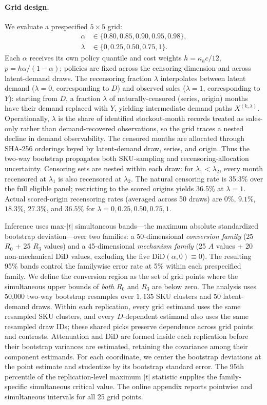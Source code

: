 \documentclass[msom,dblanonrev]{informs4}
\begin{document}
\paragraph{Grid design.}
We evaluate a prespecified $5\times 5$ grid:
\[
\begin{aligned}
\alpha &\in \{0.80,0.85,0.90,0.95,0.98\},\\
\lambda &\in \{0,0.25,0.50,0.75,1\}.
\end{aligned}
\]
Each $\alpha$ receives its own policy quantile and cost weights $h=\kappa_h c/12$, $p=h\alpha/(1-\alpha)$; policies are fixed across the censoring dimension and across latent-demand draws.
The recensoring fraction $\lambda$ interpolates between latent demand ($\lambda=0$, corresponding to $D$) and observed sales ($\lambda=1$, corresponding to $Y$): starting from $D$, a fraction $\lambda$ of naturally-censored (series, origin) months have their demand replaced with $Y$, yielding intermediate demand paths $X^{(k,\lambda)}$.
Operationally, $\lambda$ is the share of identified stockout-month records treated as sales-only rather than demand-recovered observations, so the grid traces a nested decline in demand observability.
The censored months are allocated through SHA-256 orderings keyed by latent-demand draw, series, and origin.
Thus the two-way bootstrap propagates both SKU-sampling and recensoring-allocation uncertainty.
Censoring sets are nested within each draw: for $\lambda_1<\lambda_2$, every month recensored at $\lambda_1$ is also recensored at $\lambda_2$.
The natural censoring rate is 35.3\% over the full eligible panel; restricting to the scored origins yields 36.5\% at $\lambda=1$.
Actual scored-origin recensoring rates (averaged across 50 draws) are $0\%$, $9.1\%$, $18.3\%$, $27.3\%$, and $36.5\%$ for $\lambda=0,0.25,0.50,0.75,1$.

Inference uses max-$|t|$ simultaneous bands---the maximum absolute standardized bootstrap deviation---over two families: a 50-dimensional \emph{conversion family} (25 $R_0$ + 25 $R_3$ values) and a 45-dimensional \emph{mechanism family} (25 $A$ values + 20 non-mechanical $\mathrm{DiD}$ values, excluding the five $\mathrm{DiD}(\alpha,0)\equiv 0$).
The resulting 95\% bands control the familywise error rate at 5\% within each prespecified family.
We define the conversion region as the set of grid points where the simultaneous upper bounds of \emph{both} $R_0$ and $R_3$ are below zero.
The analysis uses 50{,}000 two-way bootstrap resamples over $1{,}135$ SKU clusters and 50 latent-demand draws.
Within each replication, every grid estimand uses the same resampled SKU clusters, and every $D$-dependent estimand also uses the same resampled draw IDs; these shared picks preserve dependence across grid points and contrasts.
Attenuation and DiD are formed inside each replication before their bootstrap variances are estimated, retaining the covariance among their component estimands.
For each coordinate, we center the bootstrap deviations at the point estimate and studentize by its bootstrap standard error.
The 95th percentile of the replication-level maximum $|t|$ statistic supplies the family-specific simultaneous critical value.
The online appendix reports pointwise and simultaneous intervals for all 25 grid points.
\end{document}
